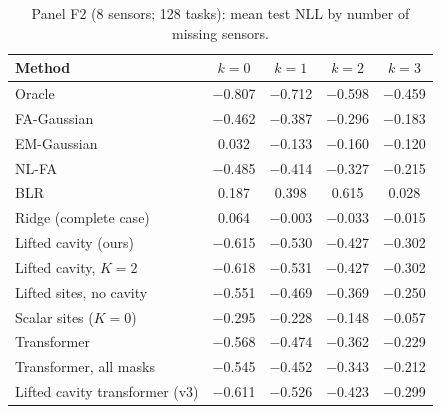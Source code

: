 \begin{table}[h]
\centering\small
\caption{\label{tab:moreF2}Panel F2 (8 sensors; 128 tasks): mean test NLL by number of missing sensors.}
\begin{tabular}{lcccc}
\toprule
Method & $k{=}0$ & $k{=}1$ & $k{=}2$ & $k{=}3$\\
\midrule
Oracle & $-$0.807 & $-$0.712 & $-$0.598 & $-$0.459\\
FA-Gaussian & $-$0.462 & $-$0.387 & $-$0.296 & $-$0.183\\
EM-Gaussian & 0.032 & $-$0.133 & $-$0.160 & $-$0.120\\
NL-FA & $-$0.485 & $-$0.414 & $-$0.327 & $-$0.215\\
BLR & 0.187 & 0.398 & 0.615 & 0.028\\
Ridge (complete case) & 0.064 & $-$0.003 & $-$0.033 & $-$0.015\\
Lifted cavity (ours) & $-$0.615 & $-$0.530 & $-$0.427 & $-$0.302\\
Lifted cavity, $K=2$ & $-$0.618 & $-$0.531 & $-$0.427 & $-$0.302\\
Lifted sites, no cavity & $-$0.551 & $-$0.469 & $-$0.369 & $-$0.250\\
Scalar sites ($K=0$) & $-$0.295 & $-$0.228 & $-$0.148 & $-$0.057\\
Transformer & $-$0.568 & $-$0.474 & $-$0.362 & $-$0.229\\
Transformer, all masks & $-$0.545 & $-$0.452 & $-$0.343 & $-$0.212\\
Lifted cavity transformer (v3) & $-$0.611 & $-$0.526 & $-$0.423 & $-$0.299\\
\bottomrule
\end{tabular}
\end{table}

